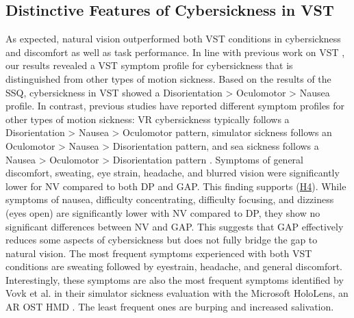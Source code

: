 \subsection{Distinctive Features of Cybersickness in VST}  
As expected, natural vision outperformed both VST conditions in cybersickness and discomfort as well as task performance. In line with previous work on VST \cite{de2024visual}, our results revealed a VST symptom profile for cybersickness that is distinguished from other types of motion sickness. Based on the results of the SSQ, cybersickness in VST showed a  Disorientation > Oculomotor > Nausea profile. In contrast, previous studies have reported different symptom profiles for other types of motion sickness: VR cybersickness typically follows a Disorientation > Nausea > Oculomotor pattern, simulator sickness follows an Oculomotor > Nausea > Disorientation pattern, and sea sickness follows a Nausea > Oculomotor > Disorientation pattern \cite{de2024visual,gallagher2018cybersickness,somrak2019estimating}. Symptoms of general discomfort, sweating, eye strain, headache, and blurred vision were significantly lower for NV compared to both DP and GAP. This finding supports (\hyperlink{hypo:H4}{H4}). 
While symptoms of nausea, difficulty concentrating, difficulty focusing, and dizziness (eyes open) are significantly lower with NV compared to DP, they show no significant differences between NV and GAP. 
This suggests that GAP effectively reduces some aspects of cybersickness but does not fully bridge the gap to natural vision. 
The most frequent symptoms experienced with both VST conditions are sweating followed by eyestrain, headache, and general discomfort. 
Interestingly, these symptoms are also the most frequent symptoms identified by Vovk et al. in their simulator sickness evaluation with the Microsoft HoloLens, an AR OST HMD \cite{vovk2018simulator}. 
The least frequent ones are burping and increased salivation.
